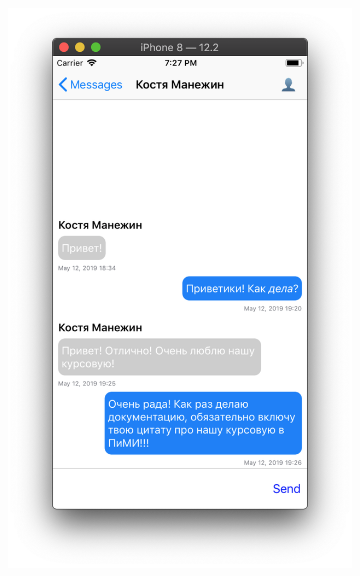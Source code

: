 \documentclass[a4paper,12pt]{article}
\begin{document}
\begin{figure}[h!]
\begin{subfigure}[b]{0.3\linewidth}
		\end{subfigure}
		\begin{subfigure}[b]{0.3\linewidth}
			\includegraphics[width=\linewidth]{../includes/pmi/userChat.png}
		\end{subfigure}
		\begin{subfigure}[b]{0.3\linewidth}

\end{subfigure}
\end{figure}
\end{document}
